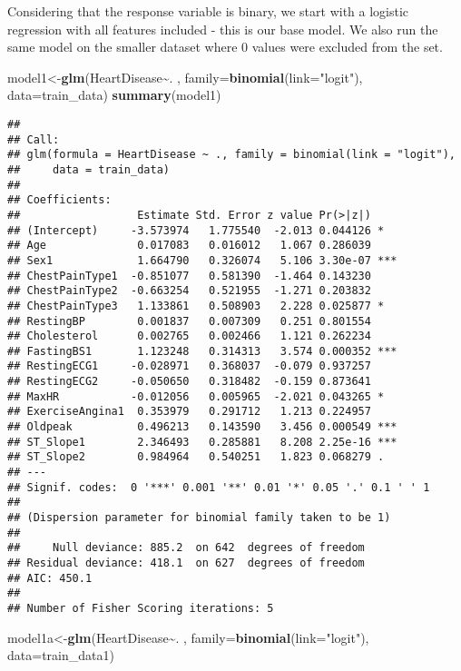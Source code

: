 \documentclass[
]{article}
\newenvironment{Shaded}{\begin{snugshade}}{\end{snugshade}}
\newcommand{\AttributeTok}[1]{\textcolor[rgb]{0.13,0.29,0.53}{#1}}
\newcommand{\FunctionTok}[1]{\textcolor[rgb]{0.13,0.29,0.53}{\textbf{#1}}}
\newcommand{\NormalTok}[1]{#1}
\newcommand{\OtherTok}[1]{\textcolor[rgb]{0.56,0.35,0.01}{#1}}
\newcommand{\SpecialCharTok}[1]{\textcolor[rgb]{0.81,0.36,0.00}{\textbf{#1}}}
\newcommand{\StringTok}[1]{\textcolor[rgb]{0.31,0.60,0.02}{#1}}
\begin{document}
Considering that the response variable is binary, we start with a
logistic regression with all features included - this is our base model.
We also run the same model on the smaller dataset where 0 values were
excluded from the set.

\begin{Shaded}
\begin{Highlighting}[]
\NormalTok{model1}\OtherTok{\textless{}{-}}\FunctionTok{glm}\NormalTok{(HeartDisease}\SpecialCharTok{\textasciitilde{}}\NormalTok{. , }\AttributeTok{family=}\FunctionTok{binomial}\NormalTok{(}\AttributeTok{link=}\StringTok{"logit"}\NormalTok{), }\AttributeTok{data=}\NormalTok{train\_data)}
\FunctionTok{summary}\NormalTok{(model1)}
\end{Highlighting}
\end{Shaded}

\begin{verbatim}
## 
## Call:
## glm(formula = HeartDisease ~ ., family = binomial(link = "logit"), 
##     data = train_data)
## 
## Coefficients:
##                  Estimate Std. Error z value Pr(>|z|)    
## (Intercept)     -3.573974   1.775540  -2.013 0.044126 *  
## Age              0.017083   0.016012   1.067 0.286039    
## Sex1             1.664790   0.326074   5.106 3.30e-07 ***
## ChestPainType1  -0.851077   0.581390  -1.464 0.143230    
## ChestPainType2  -0.663254   0.521955  -1.271 0.203832    
## ChestPainType3   1.133861   0.508903   2.228 0.025877 *  
## RestingBP        0.001837   0.007309   0.251 0.801554    
## Cholesterol      0.002765   0.002466   1.121 0.262234    
## FastingBS1       1.123248   0.314313   3.574 0.000352 ***
## RestingECG1     -0.028971   0.368037  -0.079 0.937257    
## RestingECG2     -0.050650   0.318482  -0.159 0.873641    
## MaxHR           -0.012056   0.005965  -2.021 0.043265 *  
## ExerciseAngina1  0.353979   0.291712   1.213 0.224957    
## Oldpeak          0.496213   0.143590   3.456 0.000549 ***
## ST_Slope1        2.346493   0.285881   8.208 2.25e-16 ***
## ST_Slope2        0.984964   0.540251   1.823 0.068279 .  
## ---
## Signif. codes:  0 '***' 0.001 '**' 0.01 '*' 0.05 '.' 0.1 ' ' 1
## 
## (Dispersion parameter for binomial family taken to be 1)
## 
##     Null deviance: 885.2  on 642  degrees of freedom
## Residual deviance: 418.1  on 627  degrees of freedom
## AIC: 450.1
## 
## Number of Fisher Scoring iterations: 5
\end{verbatim}

\begin{Shaded}
\begin{Highlighting}[]
\NormalTok{model1a}\OtherTok{\textless{}{-}}\FunctionTok{glm}\NormalTok{(HeartDisease}\SpecialCharTok{\textasciitilde{}}\NormalTok{. , }\AttributeTok{family=}\FunctionTok{binomial}\NormalTok{(}\AttributeTok{link=}\StringTok{"logit"}\NormalTok{), }\AttributeTok{data=}\NormalTok{train\_data1)}
\end{Highlighting}
\end{Shaded}
\end{document}
